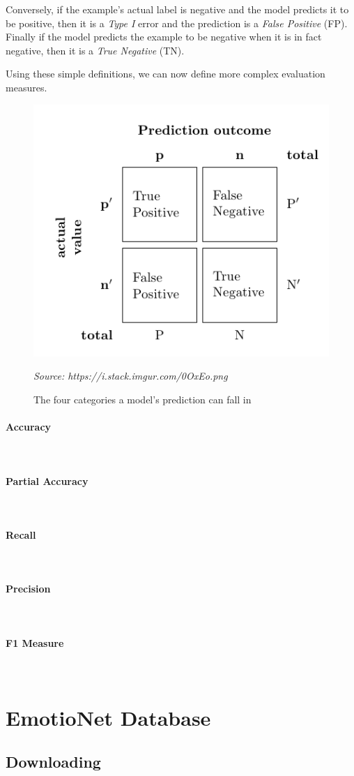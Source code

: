 \documentclass[12pt,twoside]{article}
\newcommand{\source}[1]{\vspace{-3pt} \caption*{ \footnotesize{\textit{Source: {#1}}}} }
\newcommand{\para}[1]{\paragraph{#1}\mbox{}\\}
\begin{document}
Conversely, if the example's actual label is negative and the model predicts
it to be positive, then it is a \textit{Type I} error and the prediction is a
\textit{False Positive} (FP). Finally if the model predicts the example to be
negative when it is in fact negative, then it is a \textit{True Negative}
(TN).

Using these simple definitions, we can now define more complex evaluation
measures.

\begin{figure}[ht]
  \centering
  \includegraphics[scale=0.7]{figures/tf_pos_neg.png}
  \caption{The four categories a model's prediction can fall in}
  \source{https://i.stack.imgur.com/0OxEo.png}
  \label{fig:tf_pos_neg}
\end{figure}

\para{Accuracy}\label{para:accuracy}

\para{Partial Accuracy}\label{para:partial_accuracy}

\para{Recall}\label{para:recall}

\para{Precision}\label{para:precision}

\para{F1 Measure}\label{para:f1_measure}

\section{EmotioNet Database}
 
\subsection{Downloading}
\end{document}
